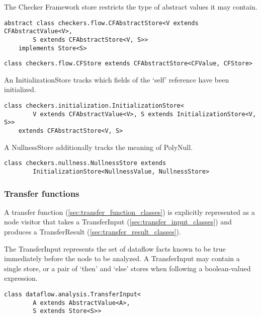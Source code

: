     The Checker Framework store restricts the type of abstract values it may contain.

    \begin{verbatim}abstract class checkers.flow.CFAbstractStore<V extends CFAbstractValue<V>,
        S extends CFAbstractStore<V, S>>
    implements Store<S>\end{verbatim}
    
    \begin{verbatim}class checkers.flow.CFStore extends CFAbstractStore<CFValue, CFStore>\end{verbatim}
    
    An InitializationStore tracks which fields of the `self' reference have been initialized.
    
    \begin{verbatim}class checkers.initialization.InitializationStore<
        V extends CFAbstractValue<V>, S extends InitializationStore<V, S>>
    extends CFAbstractStore<V, S>\end{verbatim}
    
    A NullnessStore additionally tracks the meaning of PolyNull.
    
    \begin{verbatim}class checkers.nullness.NullnessStore extends
        InitializationStore<NullnessValue, NullnessStore>\end{verbatim}


\subsubsection{Transfer functions}
\label{sec:transfer_functions}

    A transfer function (\autoref{sec:transfer_function_classes}) is
    explicitly represented as a node visitor that takes a TransferInput
    (\autoref{sec:transfer_input_classes}) and produces a TransferResult
    (\autoref{sec:transfer_result_classes}).

\label{sec:transfer_input_classes}

The TransferInput represents the set of dataflow facts known to be true immediately before the node to be analyzed.  A TransferInput may contain a single store, or a pair of `then' and `else' stores when following a boolean-valued expression.

    \begin{verbatim}class dataflow.analysis.TransferInput<
        A extends AbstractValue<A>,
        S extends Store<S>>\end{verbatim}

